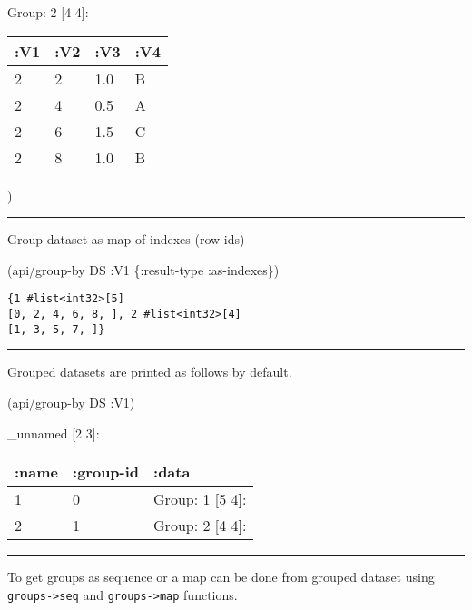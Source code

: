 \documentclass[]{article}
\newenvironment{Shaded}{\begin{snugshade}}{\end{snugshade}}
\newcommand{\AttributeTok}[1]{\textcolor[rgb]{0.77,0.63,0.00}{#1}}
\newcommand{\NormalTok}[1]{#1}
\begin{document}
Group: 2 {[}4 4{]}:

\begin{longtable}[]{@{}llll@{}}
\toprule
:V1 & :V2 & :V3 & :V4\tabularnewline
\midrule
\endhead
2 & 2 & 1.0 & B\tabularnewline
2 & 4 & 0.5 & A\tabularnewline
2 & 6 & 1.5 & C\tabularnewline
2 & 8 & 1.0 & B\tabularnewline
\bottomrule
\end{longtable}

)

\begin{center}\rule{0.5\linewidth}{0.5pt}\end{center}

Group dataset as map of indexes (row ids)

\begin{Shaded}
\begin{Highlighting}[]
\NormalTok{(api/group-by DS }\AttributeTok{:V1}\NormalTok{ \{}\AttributeTok{:result-type} \AttributeTok{:as-indexes}\NormalTok{\})}
\end{Highlighting}
\end{Shaded}

\begin{verbatim}
{1 #list<int32>[5]
[0, 2, 4, 6, 8, ], 2 #list<int32>[4]
[1, 3, 5, 7, ]}
\end{verbatim}

\begin{center}\rule{0.5\linewidth}{0.5pt}\end{center}

Grouped datasets are printed as follows by default.

\begin{Shaded}
\begin{Highlighting}[]
\NormalTok{(api/group-by DS }\AttributeTok{:V1}\NormalTok{)}
\end{Highlighting}
\end{Shaded}

\_unnamed {[}2 3{]}:

\begin{longtable}[]{@{}lll@{}}
\toprule
:name & :group-id & :data\tabularnewline
\midrule
\endhead
1 & 0 & Group: 1 {[}5 4{]}:\tabularnewline
2 & 1 & Group: 2 {[}4 4{]}:\tabularnewline
\bottomrule
\end{longtable}

\begin{center}\rule{0.5\linewidth}{0.5pt}\end{center}

To get groups as sequence or a map can be done from grouped dataset
using \texttt{groups-\textgreater{}seq} and
\texttt{groups-\textgreater{}map} functions.
\end{document}

